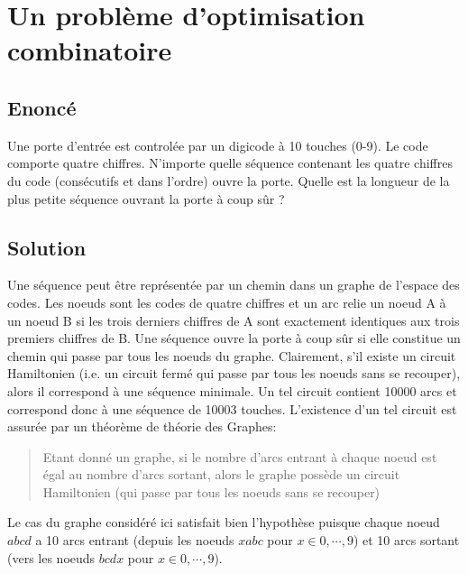 \documentclass{article}
\newenvironment{statement}{\subsection{Enoncé}}{\pagebreak}
\newenvironment{solution}{\subsection{Solution}}{\pagebreak}
\begin{document}
\section{Un problème d'optimisation combinatoire}
\begin{statement}
Une porte d'entrée est controlée par un digicode à 10 touches (0-9). Le code comporte quatre chiffres. N'importe quelle séquence contenant les quatre chiffres du code (consécutifs et dans l'ordre) ouvre la porte. Quelle est la longueur de la plus petite séquence ouvrant la porte à coup sûr ?
\end{statement}
\begin{solution}
Une séquence peut être représentée par un chemin dans un graphe de l'espace des codes. Les noeuds sont les codes de quatre chiffres et un arc relie un noeud A à un noeud B si les trois derniers chiffres de A sont exactement identiques aux trois premiers chiffres de B. Une séquence ouvre la porte à coup sûr si elle constitue un chemin qui passe par tous les noeuds du graphe. Clairement, s'il existe un circuit Hamiltonien (i.e. un circuit fermé qui passe par tous les noeuds sans se recouper), alors il correspond à une séquence minimale. Un tel circuit contient 10000 arcs et correspond donc à une séquence de 10003 touches. L'existence d'un tel circuit est assurée par un théorème de théorie des Graphes:
\begin{quote}
Etant donné un graphe, si le nombre d'arcs entrant à chaque noeud est égal au nombre d'arcs sortant, alors le graphe possède un circuit Hamiltonien (qui passe par tous les noeuds sans se recouper)
\end{quote}
Le cas du graphe considéré ici satisfait bien l'hypothèse puisque chaque noeud $abcd$ a 10 arcs entrant (depuis les noeuds $xabc$ pour $x\in0,\cdots,9$) et 10 arcs sortant (vers les noeuds $bcdx$ pour $x\in0,\cdots,9$).
\end{solution}

\end{document}
